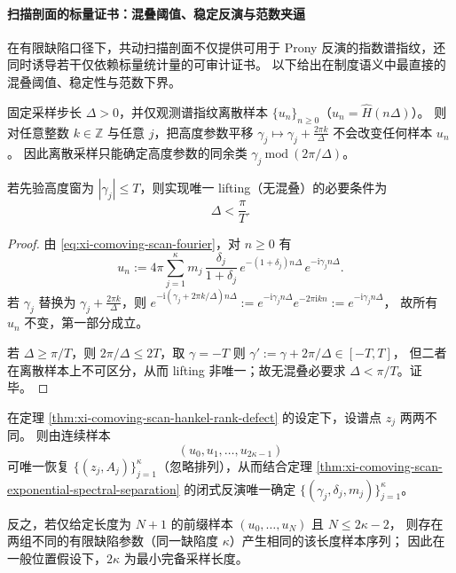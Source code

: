 \paragraph{扫描剖面的标量证书：混叠阈值、稳定反演与范数夹逼}
在有限缺陷口径下，共动扫描剖面不仅提供可用于 Prony 反演的指数谱指纹，还同时诱导若干仅依赖标量统计量的可审计证书。
以下给出在制度语义中最直接的混叠阈值、稳定性与范数下界。

\begin{proposition}\label{prop:xi-scan-aliasing-threshold}
固定采样步长 \(\Delta>0\)，并仅观测谱指纹离散样本 \(\{u_n\}_{n\ge 0}\)（\(u_n=\widehat H(n\Delta)\)）。
则对任意整数 \(k\in\mathbb{Z}\) 与任意 \(j\)，把高度参数平移
\(
\gamma_j\mapsto \gamma_j+\frac{2\pi k}{\Delta}
\)
不会改变任何样本 \(u_n\)。
因此离散采样只能确定高度参数的同余类 \(\gamma_j\ \mathrm{mod}\ (2\pi/\Delta)\)。
\par
若先验高度窗为 \(|\gamma_j|\le T\)，则实现唯一 lifting（无混叠）的必要条件为
\[
\boxed{\;\Delta<\frac{\pi}{T}.\;}
\]
\end{proposition}

\begin{proof}
由 \eqref{eq:xi-comoving-scan-fourier}，对 \(n\ge 0\) 有
\[
u_n
:=4\pi\sum_{j=1}^{\kappa}m_j\,\frac{\delta_j}{1+\delta_j}\,e^{-(1+\delta_j)n\Delta}\,e^{-\mathrm{i}\gamma_j n\Delta}.
\]
若 \(\gamma_j\) 替换为 \(\gamma_j+\frac{2\pi k}{\Delta}\)，则
\(
e^{-\mathrm{i}(\gamma_j+2\pi k/\Delta)n\Delta}
:=e^{-\mathrm{i}\gamma_j n\Delta}e^{-2\pi\mathrm{i}kn}
:=e^{-\mathrm{i}\gamma_j n\Delta}
\)，
故所有 \(u_n\) 不变，第一部分成立。
\par
若 \(\Delta\ge \pi/T\)，则 \(2\pi/\Delta\le 2T\)，取 \(\gamma=-T\) 则 \(\gamma':=\gamma+2\pi/\Delta\in[-T,T]\)，
但二者在离散样本上不可区分，从而 lifting 非唯一；故无混叠必要求 \(\Delta<\pi/T\)。证毕。
\end{proof}

\begin{theorem}\label{thm:xi-scan-minimal-complete-2kappa}
在定理 \ref{thm:xi-comoving-scan-hankel-rank-defect} 的设定下，设谱点 \(z_j\) 两两不同。
则由连续样本
\[
\boxed{\;
(u_0,u_1,\dots,u_{2\kappa-1})\;}
\]
可唯一恢复 \(\{(z_j,A_j)\}_{j=1}^{\kappa}\)（忽略排列），从而结合定理 \ref{thm:xi-comoving-scan-exponential-spectral-separation} 的闭式反演唯一确定
\(\{(\gamma_j,\delta_j,m_j)\}_{j=1}^{\kappa}\)。
\par
反之，若仅给定长度为 \(N+1\) 的前缀样本 \((u_0,\dots,u_{N})\) 且 \(N\le 2\kappa-2\)，
则存在两组不同的有限缺陷参数（同一缺陷度 \(\kappa\)）产生相同的该长度样本序列；
因此在一般位置假设下，\(2\kappa\) 为最小完备采样长度。
\end{theorem}

